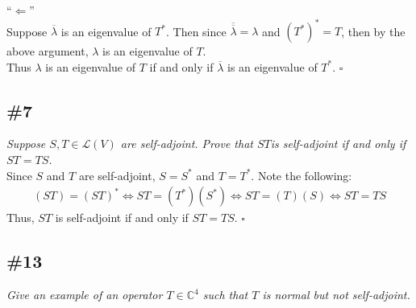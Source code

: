 \documentclass[12pt]{article}
\begin{document}
\noindent ``$\Longleftarrow$'' \\
Suppose $\overline{\lambda}$ is an eigenvalue of $T^*$.  Then since $\overline{\overline{\lambda}} = \lambda$ and $(T^*)^* = T$, then by the above argument, $\lambda$ is an eigenvalue of $T$. \\

\noindent Thus $\lambda$ is an eigenvalue of $T$ if and only if $\overline{\lambda}$ is an eigenvalue of $T^*$. \hfill $\square$

\subsection*{\#7}
{\it Suppose $S, T \in \mathcal{L}(V)$ are self-adjoint.  Prove that $ST$is self-adjoint if and only if $ST = TS$.} \\

\noindent Since $S$ and $T$ are self-adjoint, $S = S^*$ and $T = T^*$.  Note the following:
\begin{align*}
	(ST) = (ST)^* \iff ST = (T^*)(S^*) \iff ST = (T)(S)	\iff ST = TS
\end{align*}
Thus, $ST$ is self-adjoint if and only if $ST = TS$. \hfill $\square$

\subsection*{\#13}
{\it Give an example of an operator $T \in \mathcal{\mathbb{C}^4}$ such that $T$ is normal but not self-adjoint.} \\
\end{document}
